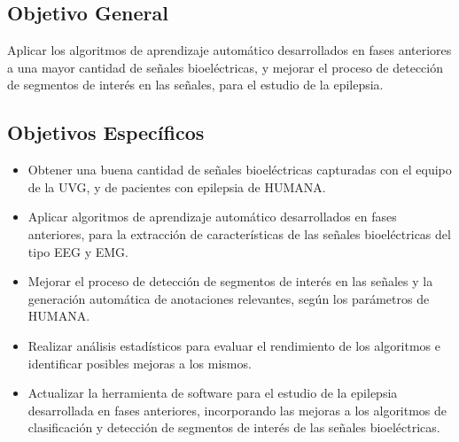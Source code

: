 \subsection*{Objetivo General}
Aplicar los algoritmos de aprendizaje automático desarrollados en fases anteriores a una mayor cantidad de señales bioeléctricas, y mejorar el proceso de detección de segmentos de interés en las señales, para el estudio de la epilepsia.

\subsection*{Objetivos Específicos}
\begin{itemize}
\item Obtener una buena cantidad de señales bioeléctricas capturadas con el equipo de la UVG, y de pacientes con epilepsia de HUMANA.
\item Aplicar algoritmos de aprendizaje automático desarrollados en fases anteriores, para la extracción de características de las señales bioeléctricas del tipo EEG y EMG.
\item Mejorar el proceso de detección de segmentos de interés en las señales y la generación automática de anotaciones relevantes, según los parámetros de HUMANA.
\item Realizar análisis estadísticos para evaluar el rendimiento de los algoritmos e identificar posibles mejoras a los mismos.
\item Actualizar la herramienta de software para el estudio de la epilepsia desarrollada en fases anteriores, incorporando las mejoras a los algoritmos de clasificación y detección de segmentos de interés de las señales bioeléctricas.
\end{itemize}

